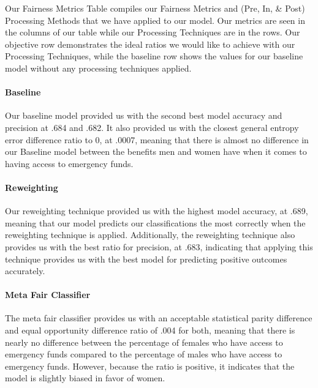 \documentclass[water,article,submit,moreauthors,pdftex]{mdpi}
\begin{document}
Our Fairness Metrics Table compiles our Fairness Metrics and (Pre, In,
\& Post) Processing Methods that we have applied to our model. Our
metrics are seen in the columns of our table while our Processing
Techniques are in the rows. Our objective row demonstrates the ideal
ratios we would like to achieve with our Processing Techniques, while
the baseline row shows the values for our baseline model without any
processing techniques applied.

\hypertarget{baseline}{%
\paragraph{Baseline}\label{baseline}}

Our baseline model provided us with the second best model accuracy and
precision at .684 and .682. It also provided us with the closest general
entropy error difference ratio to 0, at .0007, meaning that there is
almost no difference in our Baseline model between the benefits men and
women have when it comes to having access to emergency funds.

\hypertarget{reweighting}{%
\paragraph{Reweighting}\label{reweighting}}

Our reweighting technique provided us with the highest model accuracy,
at .689, meaning that our model predicts our classifications the most
correctly when the reweighting technique is applied. Additionally, the
reweighting technique also provides us with the best ratio for
precision, at .683, indicating that applying this technique provides us
with the best model for predicting positive outcomes accurately.

\hypertarget{meta-fair-classifier}{%
\paragraph{Meta Fair Classifier}\label{meta-fair-classifier}}

The meta fair classifier provides us with an acceptable statistical
parity difference and equal opportunity difference ratio of .004 for
both, meaning that there is nearly no difference between the percentage
of females who have access to emergency funds compared to the percentage
of males who have access to emergency funds. However, because the ratio
is positive, it indicates that the model is slightly biased in favor of
women.
\end{document}
